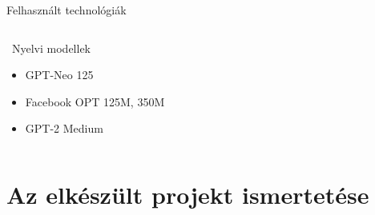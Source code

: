 \documentclass[11pt]{beamer}
\begin{document}
\begin{frame}{Felhasznált technológiák}
\begin{columns}[T]
\begin{block}{\faRobot~Nyelvi modellek}
\begin{itemize}
          \item GPT-Neo 125
          \item Facebook OPT 125M, 350M
          \item GPT-2 Medium
        \end{itemize}
      \end{block}
    \end{columns}
   		
\end{frame}

\section{Az elkészült projekt ismertetése}
\end{document}
